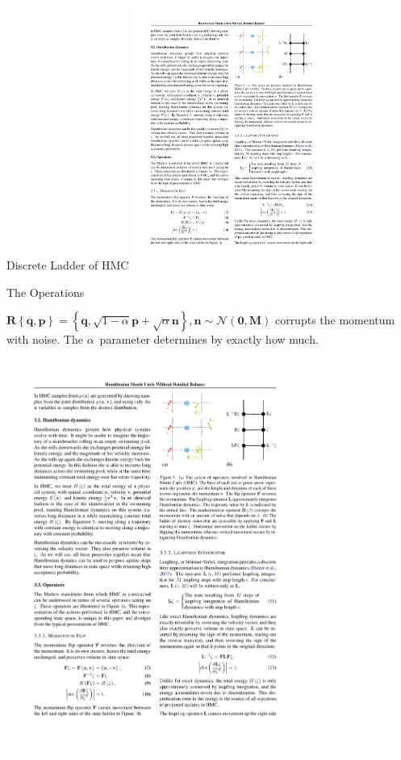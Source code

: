 \documentclass{beamer}
\renewcommand{\vec}[1]{\ensuremath{\mathbf{#1}}}
\newcommand{\mat}[1]{\ensuremath{\mathbf{#1}}}
\newcommand{\op}[1]{\ensuremath{\mathbf{#1}}}
\newcommand{\norm}{\ensuremath{\mathcal{N}}}
\begin{document}
    \begin{frame}{Discrete Ladder of HMC}
        \centering
        \includegraphics[width=0.5\textwidth]{ladder.pdf}
    \end{frame}

    \begin{frame}{The Operations}

        \begin{definition}
            $\op{R}\left\{\vec{q},\vec{p}\right\} = \left\{\vec{q}, \sqrt{1-\alpha}\vec{p} + \sqrt{\alpha}\vec{n}\right\}, \vec{n} \sim \norm\left(\vec{0}, \mat{M}\right)$ corrupts the momentum with noise. The $\alpha$~parameter determines by exactly how much.
        \end{definition}

        \vfill

        \centering
        \includegraphics[width=0.75\textwidth]{R.pdf}

    \end{frame}
\end{document}
